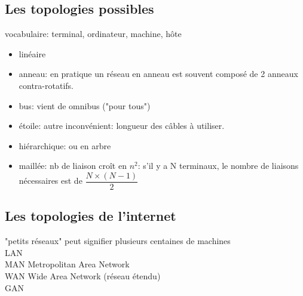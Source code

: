 \documentclass[a4paper,11pt]{article}
\begin{document}
\begin{Form}
\subsection{Les topologies possibles}
\begin{commentprof}
vocabulaire: terminal, ordinateur, machine, hôte
\end{commentprof}
\begin{itemize}
\item linéaire
\item anneau: en pratique un réseau en anneau est souvent composé de 2 anneaux contra-rotatifs.
\item bus: vient de omnibus ("pour tous")
\item étoile: autre inconvénient: longueur des câbles à utiliser.
\item hiérarchique: ou en arbre 
\item maillée: nb de liaison croît en $n^2$: s'il y a N terminaux, le nombre de liaisons nécessaires est de $\dfrac{N×(N-1)}{2}$
\end{itemize}
\subsection{Les topologies de l'internet}
\begin{commentprof}
"petits réseaux" peut signifier plusieurs centaines de machines\\
LAN\\
MAN Metropolitan Area Network\\
WAN Wide Area Network (réseau étendu)\\
GAN
\end{commentprof}
\end{Form}
\end{document}
